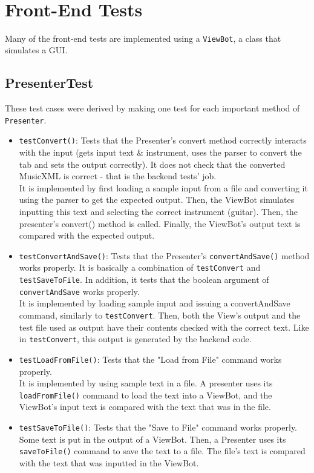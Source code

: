\documentclass[11pt]{article}
\date{\today}
\title{}
\begin{document}
\tableofcontents

\newpage\\
\section{Front-End Tests}
\label{sec:org9565573}
Many of the front-end tests are implemented using a \texttt{ViewBot}, a class that simulates a GUI.\\
\subsection{PresenterTest}
\label{sec:org58b2894}
These test cases were derived by making one test for each important method of \texttt{Presenter}.\\
\begin{itemize}
\item \texttt{testConvert()}: Tests that the Presenter's convert method correctly interacts with the input (gets input text \& instrument, uses the parser to convert the tab and sets the output correctly).  It does not check that the converted MusicXML is correct - that is the backend tests' job.\\
It is implemented by first loading a sample input from a file and converting it using the parser to get the expected output.  Then, the ViewBot simulates inputting this text and selecting the correct instrument (guitar).  Then, the presenter's convert() method is called.  Finally, the ViewBot's output text is compared with the expected output.\\
\item \texttt{testConvertAndSave()}: Tests that the Presenter's \texttt{convertAndSave()} method works properly.  It is basically a combination of \texttt{testConvert} and \texttt{testSaveToFile}.  In addition, it tests that the boolean argument of \texttt{convertAndSave} works properly.\\
It is implemented by loading sample input and issuing a convertAndSave command, similarly to \texttt{testConvert}.  Then, both the View's output and the test file used as output have their contents checked with the correct text.  Like in \texttt{testConvert}, this output is generated by the backend code.\\
\item \texttt{testLoadFromFile()}: Tests that the "Load from File" command works properly.\\
It is implemented by using sample text in a file.  A presenter uses its \texttt{loadFromFile()} command to load the text into a ViewBot, and the ViewBot's input text is compared with the text that was in the file.\\
\item \texttt{testSaveToFile()}: Tests that the "Save to File" command works properly.\\
Some text is put in the output of a ViewBot.  Then, a Presenter uses its \texttt{saveToFile()} command to save the text to a file.  The file's text is compared with the text that was inputted in the ViewBot.\\
\end{itemize}
\end{document}
